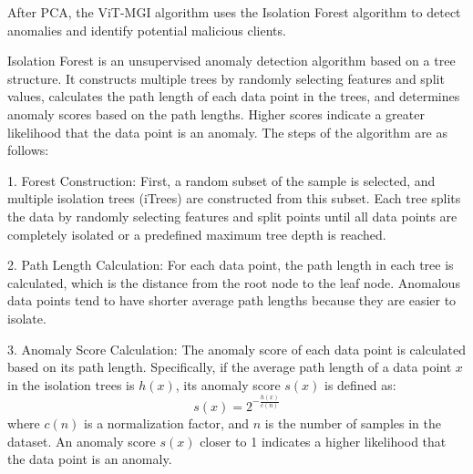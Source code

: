 \documentclass[conference]{IEEEtran}
\begin{document}

After PCA, the ViT-MGI algorithm uses the Isolation Forest algorithm to detect anomalies and identify potential malicious clients. 


Isolation Forest is an unsupervised anomaly detection algorithm based on a tree structure. It constructs multiple trees by randomly selecting features and split values, calculates the path length of each data point in the trees, and determines anomaly scores based on the path lengths. Higher scores indicate a greater likelihood that the data point is an anomaly. The steps of the algorithm are as follows:


1. Forest Construction: First, a random subset of the sample is selected, and multiple isolation trees (iTrees) are constructed from this subset. Each tree splits the data by randomly selecting features and split points until all data points are completely isolated or a predefined maximum tree depth is reached.


2. Path Length Calculation: For each data point, the path length in each tree is calculated, which is the distance from the root node to the leaf node. Anomalous data points tend to have shorter average path lengths because they are easier to isolate.


3. Anomaly Score Calculation: The anomaly score of each data point is calculated based on its path length. Specifically, if the average path length of a data point $x$ in the isolation trees is $h(x)$, its anomaly score $s(x)$ is defined as:
   \[
   s(x) = 2^{-\frac{h(x)}{c(n)}}
   \]
where $c(n)$ is a normalization factor, and $n$ is the number of samples in the dataset. An anomaly score $s(x)$ closer to 1 indicates a higher likelihood that the data point is an anomaly.
\end{document}
